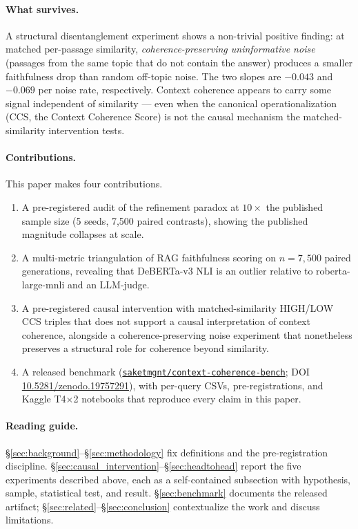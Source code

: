 \paragraph{What survives.}
A structural disentanglement experiment shows a non-trivial
positive finding: at matched per-passage similarity,
\emph{coherence-preserving uninformative noise} (passages from the
same topic that do not contain the answer) produces a smaller
faithfulness drop than random off-topic noise. The two slopes are
\(-0.043\) and \(-0.069\) per noise rate, respectively. Context
coherence appears to carry some signal independent of similarity ---
even when the canonical operationalization (CCS, the Context
Coherence Score) is not the causal mechanism the matched-similarity
intervention tests.

\paragraph{Contributions.}
This paper makes four contributions.
\begin{enumerate}
\itemsep -2pt
\item A pre-registered audit of the refinement paradox at
$10\times$ the published sample size (5 seeds, 7{,}500 paired
contrasts), showing the published magnitude collapses at scale.
\item A multi-metric triangulation of RAG faithfulness scoring on
$n{=}7{,}500$ paired generations, revealing that DeBERTa-v3 NLI is
an outlier relative to roberta-large-mnli and an LLM-judge.
\item A pre-registered causal intervention with matched-similarity
HIGH/LOW CCS triples that does not support a causal interpretation
of context coherence, alongside a coherence-preserving noise
experiment that nonetheless preserves a structural role for
coherence beyond similarity.
\item A released benchmark
(\href{https://huggingface.co/datasets/saketmgnt/context-coherence-bench}{\texttt{saketmgnt/context-coherence-bench}};
DOI \href{https://doi.org/10.5281/zenodo.19757291}{10.5281/zenodo.19757291}),
with per-query CSVs, pre-registrations, and Kaggle T4\(\times\)2
notebooks that reproduce every claim in this paper.
\end{enumerate}

\paragraph{Reading guide.}
\S\ref{sec:background}--\S\ref{sec:methodology} fix definitions and
the pre-registration discipline.
\S\ref{sec:causal_intervention}--\S\ref{sec:headtohead} report the
five experiments described above, each as a self-contained
subsection with hypothesis, sample, statistical test, and result.
\S\ref{sec:benchmark} documents the released artifact;
\S\ref{sec:related}--\S\ref{sec:conclusion} contextualize the work
and discuss limitations.
